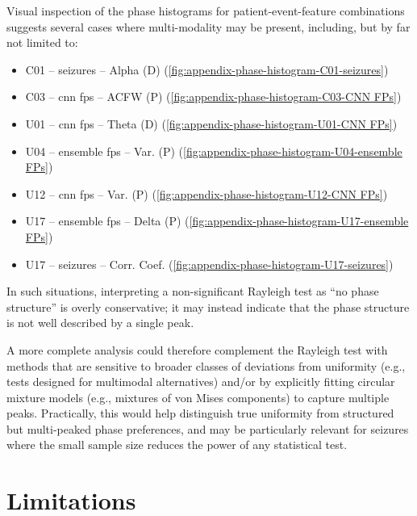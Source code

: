 Visual inspection of the phase histograms for patient-event-feature combinations suggests several cases where multi-modality may be present, including, but by far not limited to:
\begin{itemize}
    \item C01 -- seizures -- Alpha (D) (\cref{fig:appendix-phase-histogram-C01-seizures})
    \item C03 -- \gls{cnn} \glspl{fp} -- ACFW (P) (\cref{fig:appendix-phase-histogram-C03-CNN FPs})
    \item U01 -- \gls{cnn} \glspl{fp} -- Theta (D) (\cref{fig:appendix-phase-histogram-U01-CNN FPs})
    \item U04 -- ensemble \glspl{fp} -- Var.
    (P) (\cref{fig:appendix-phase-histogram-U04-ensemble FPs})
    \item U12 -- \gls{cnn} \glspl{fp} -- Var.
    (P) (\cref{fig:appendix-phase-histogram-U12-CNN FPs})
    \item U17 -- ensemble \glspl{fp} -- Delta (P) (\cref{fig:appendix-phase-histogram-U17-ensemble FPs})
    \item U17 -- seizures -- Corr.
    Coef.
    (\cref{fig:appendix-phase-histogram-U17-seizures})
\end{itemize}
In such situations, interpreting a non-significant Rayleigh test as ``no phase structure'' is overly conservative; it may instead indicate that the phase structure is not well described by a single peak.

A more complete analysis could therefore complement the Rayleigh test with methods that are sensitive to broader classes of deviations from uniformity (e.g., tests designed for multimodal alternatives) and/or by explicitly fitting circular mixture models (e.g., mixtures of von Mises components) to capture multiple peaks.
Practically, this would help distinguish true uniformity from structured but multi-peaked phase preferences, and may be particularly relevant for seizures where the small sample size reduces the power of any statistical test.


\section{Limitations}\label{sec:limitations}
